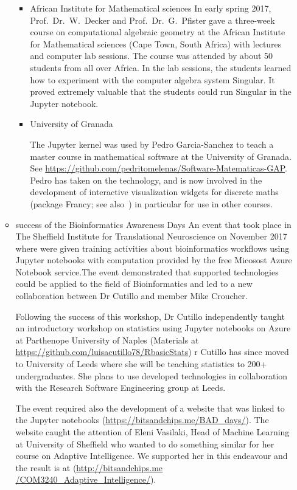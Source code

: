 \begin{enumerate}
\begin{itemize}
\begin{itemize}
 \item African Institute for Mathematical sciences
 In early spring 2017, Prof.~Dr.~W.~Decker and Prof.~Dr.~G.~Pfister gave a three-week course on computational algebraic geometry 
     at the African Institute for Mathematical sciences (Cape Town, South Africa) with lectures and computer lab sessions.
     The course was attended by about 50 students from all over Africa. In the lab sessions, the students learned how to experiment with the
     computer algebra system Singular. It proved extremely valuable that the students could run Singular in the Jupyter notebook.
     
  \item University of Granada
     
     The \GAP Jupyter kernel was used by Pedro Garcia-Sanchez to teach a master course in mathematical software at the University of
     Granada. See  \url{https://github.com/pedritomelenas/Software-Matematicas-GAP}. Pedro has taken on the technology, and is now involved
     in the   development of interactive visualization widgets for discrete maths (package Francy; see also~) in particular for use in other courses.
     
  \end{itemize}

\item success of the Bioinformatics Awareness Days
An event that took place in The Sheffield Institute for Translational Neuroscience on November 2017 where were given training activities 
about bioinformatics workflows using Jupyter notebooks with computation provided by the free Micosost Azure Notebook service.The event 
demonstrated that \ODK supported technologies could be applied to the field of Bioinformatics and led to a new collaboration between Dr 
Cutillo and \ODK member Mike Croucher.

Following the success of this workshop, Dr Cutillo independently taught an introductory workshop on statistics using Jupyter notebooks 
on Azure at Parthenope University of Naples (Materials at \url{https://github.com/luisacutillo78/RbasicStats}) r Cutillo has since moved 
to University of Leeds where she will be teaching statistics to 200+ undergraduates. She plans to use \ODK developed technologies 
in collaboration with the Research Software Engineering group at Leeds.

The event required also the development of a website that was linked to the Jupyter notebooks (\url{https://bitsandchips.me/BAD_days/}). The 
website caught the attention of Eleni Vasilaki, Head of Machine Learning at University of Sheffield who wanted to do something similar for 
her course on Adaptive Intelligence. We supported her in this endeavour and the result is at (\url{http://bitsandchips.me
/COM3240_Adaptive_Intelligence/}).


\end{itemize}
\end{enumerate}
